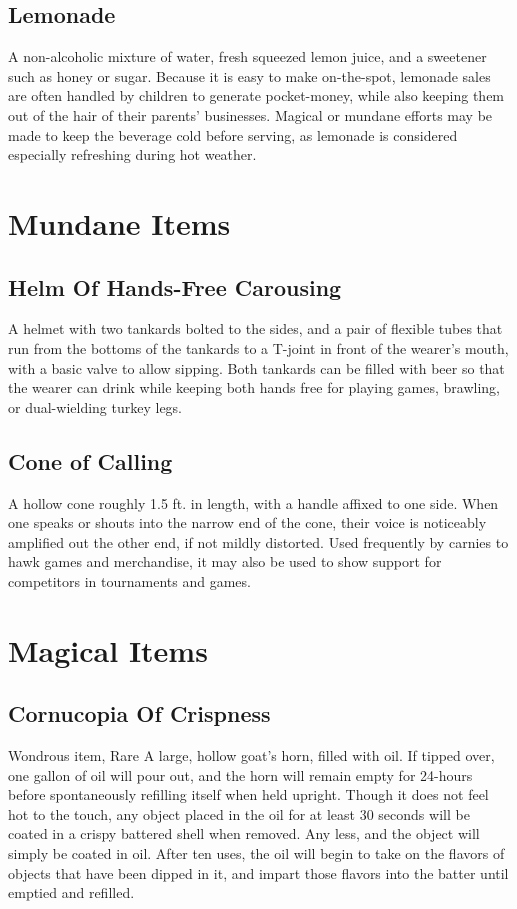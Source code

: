 \documentclass[10pt,a4paper,twoside,twocolumn,openany,bg=print,nodeprecatedcode]{dndbook}
\begin{document}
\subsection{Lemonade}
A non-alcoholic mixture of water, fresh squeezed lemon juice, and a sweetener such as honey or sugar. Because it is easy to make on-the-spot, lemonade sales are often handled by children to generate pocket-money, while also keeping them out of the hair of their parents' businesses. Magical or mundane efforts may be made to keep the beverage cold before serving, as lemonade is considered especially refreshing during hot weather.
\section{Mundane Items}
\subsection{Helm Of Hands-Free Carousing}
A helmet with two tankards bolted to the sides, and a pair of flexible tubes that run from the bottoms of the tankards to a T-joint in front of the wearer's mouth, with a basic valve to allow sipping. Both tankards can be filled with beer so that the wearer can drink while keeping both hands free for playing games, brawling, or dual-wielding turkey legs.
\subsection{Cone of Calling}
A hollow cone roughly 1.5 ft. in length, with a handle affixed to one side. When one speaks or shouts into the narrow end of the cone, their voice is noticeably amplified out the other end, if not mildly distorted. Used frequently by carnies to hawk games and merchandise, it may also be used to show support for competitors in tournaments and games.
\section{Magical Items}
\subsection{Cornucopia Of Crispness}
Wondrous item, Rare
A large, hollow goat's horn, filled with oil. If tipped over, one gallon of oil will pour out, and the horn will remain empty for 24-hours before spontaneously refilling itself when held upright. Though it does not feel hot to the touch, any object placed in the oil for at least 30 seconds will be coated in a crispy battered shell when removed. Any less, and the object will simply be coated in oil. After ten uses, the oil will begin to take on the flavors of objects that have been dipped in it, and impart those flavors into the batter until emptied and refilled. 
\end{document}
